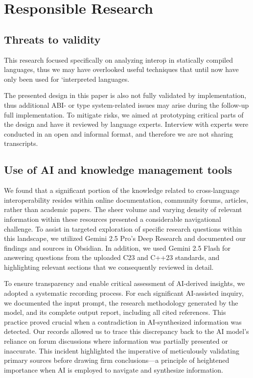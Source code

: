 \section{Responsible Research}
\subsection{Threats to validity}
This research focused specifically on analyzing interop in statically compiled languages, thus we may have overlooked useful techniques that until now have only been used for `interpreted languages.

The presented design in this paper is also not fully validated by implementation, thus additional ABI- or type system-related issues may arise during the follow-up full implementation. To mitigate risks, we aimed at prototyping critical parts of the design and have it reviewed by language experts. Interview with experts were conducted in an open and informal format, and therefore we are not sharing transcripts.

\subsection{Use of AI and knowledge management tools}
We found that a significant portion of the knowledge related to cross-language interoperability resides within online documentation, community forums, articles, rather than academic papers. The sheer volume and varying density of relevant information within these resources presented a considerable navigational challenge. To assist in targeted exploration of specific research questions within this landscape, we utilized Gemini 2.5 Pro's Deep Research and documented our findings and sources in Obsidian. In addition, we used Gemini 2.5 Flash for answering questions from the uploaded C23 and C++23 standards, and highlighting relevant sections that we consequently reviewed in detail.

To ensure transparency and enable critical assessment of AI-derived insights, we adopted a systematic recording process. For each significant AI-assisted inquiry, we documented the input prompt, the research methodology generated by the model, and its complete output report, including all cited references. This practice proved crucial when a contradiction in AI-synthesized information was detected. Our records allowed us to trace this discrepancy back to the AI model's reliance on forum discussions where information was partially presented or inaccurate. This incident highlighted the imperative of meticulously validating primary sources before drawing firm conclusions—a principle of heightened importance when AI is employed to navigate and synthesize information.

